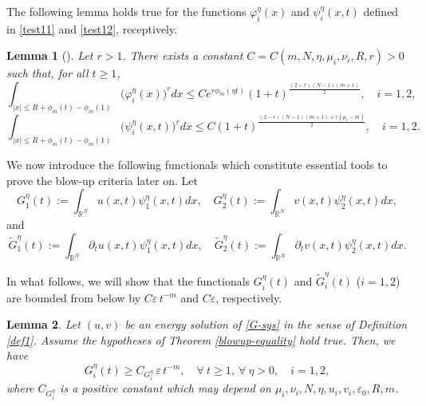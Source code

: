 \documentclass[12pt,leqno]{amsart}
\numberwithin{equation}{section}
\newtheorem{lem}{Lemma}[section]
\theoremstyle{remark}
\newcommand{\ep}{\varepsilon}
\def\R{{\mathbb{R}}}
\def\e{{\varepsilon}}
\def\G{G_1}
\def\GG{\tilde{G}_1}
\def\H{G_2}
\def\HH{\tilde{G}_2}
\def\p{\partial}
\begin{document}
The following lemma  holds true for the functions $\varphi^{\eta}_i(x)$ and  $\psi^{\eta}_i(x,t)$ defined in \eqref{test11} and \eqref{test12}, receptively.
\begin{lem}[\cite{YZ06}]
\label{lem1} Let  $r>1$.
There exists a constant $C=C(m,N,\eta,\mu_i,\nu_i,R,r)>0$  such that, for all $t \ge 1$, 
\begin{equation}\label{phi-est}
\int_{|x|\leq R+\phi_{m}(t)-\phi_{m}(1)}\Big(\varphi^{\eta}_i(x)\Big)^{r}dx
\leq Ce^{r \phi_{m}(\eta t)}(1+t)^{\frac{(2-r)(N-1)(m+1)}{2}},
\quad i=1,2,
\end{equation}
\begin{equation}
\label{psi}
\int_{|x|\leq R+\phi_{m}(t)-\phi_{m}(1)}\Big(\psi^{\eta}_i(x,t)\Big)^{r}dx
\leq C (1+t)^{\frac{(2-r)(N-1)(m+1)+r(\mu_i-m)}{2}},
\quad i=1,2.
\end{equation}
\end{lem}





\par
We now introduce the following functionals which constitute essential tools to prove the blow-up criteria later on. Let
\begin{equation}
\label{F1def}
\G^{\eta} (t):=\int_{\R^N}u(x, t)\psi^{\eta}_1(x, t)dx, \quad \H^{\eta} (t):=\int_{\R^N}v(x, t)\psi^{\eta}_2(x, t)dx,
\end{equation}
and
\begin{equation}
\label{F2def}
\GG^{\eta} (t):=\int_{\R^N}\p_tu(x, t)\psi^{\eta}_1(x, t)dx, \quad \HH^{\eta} (t):=\int_{\R^N}\p_t v(x, t)\psi^{\eta}_2(x, t)dx.
\end{equation}


In what follows, we will show that the functionals  $G^{\eta}_i(t)$ and $\tilde{G}^{\eta}_i(t)$ ($i=1,2$) are bounded from below by $C\e \, t^{-m}$ and $C\e$, respectively.  
\begin{lem}
\label{F1}
Let $(u,v)$ be an energy solution of  \eqref{G-sys} in the sense of Definition \ref{def1}. Assume the hypotheses of Theorem \ref{blowup-equality} hold true. Then,  we have
\begin{equation}
\label{F1postive}
G^{\eta}_i(t)\ge C_{G^{\eta}_i}\, \e \, t^{-m}, 
\quad \forall \ t \ge 1,  \ \forall \ \eta > 0, \quad i=1,2,
\end{equation}
where $C_{G^{\eta}_i}$ is a positive constant which may depend on $\mu_i,\nu_i,N,\eta,u_i,v_i,\ep_0, R,m$.
\end{lem}
\end{document}
